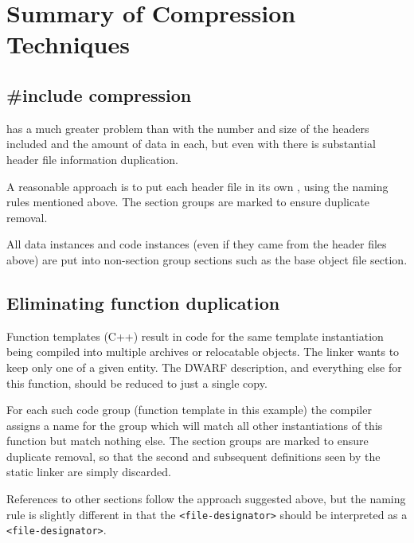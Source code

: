 \section{Summary of Compression Techniques}
\label{app:summaryofcompressiontechniques}
\subsection{\#include compression}
\label{app:includecompression}

 has a much greater 
problem than 
 with the number and
size of the headers included and the amount of data in each,
but even with  
there is substantial header file information
duplication.

A reasonable approach is to put each header file in its own
, using the naming rules mentioned above. The
section groups are marked to ensure duplicate removal.

All data instances and code instances (even if they came
from the header files above) are put 
into non-section group
sections such as the base object file 
\dotdebuginfo{} section.

\subsection{Eliminating function duplication}
\label{app:eliminatingfunctionduplication}


Function templates (C++) result in code for the same template
instantiation being compiled into multiple archives or
relocatable objects. The linker wants to keep only one of a
given entity. The DWARF description, and everything else for
this function, should be reduced to just a single copy.

For each such code group (function template in this example)
the compiler assigns a name for the group which will match
all other instantiations of this function but match nothing
else. 
The 
section groups are marked to ensure duplicate
removal, so that the second and subsequent definitions seen
by the static linker are simply discarded.


References to other 
\dotdebuginfo{} sections follow the approach
suggested above, but the naming rule is slightly
different in that the \texttt{\textless file-designator\textgreater} 
should be interpreted as a \texttt{\textless file-designator\textgreater}.



